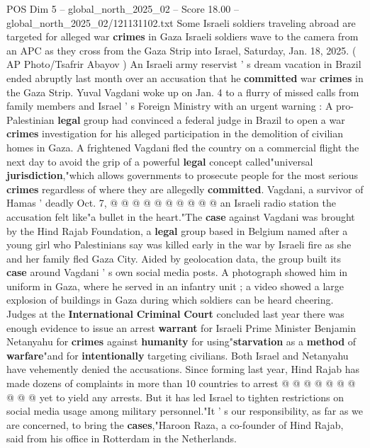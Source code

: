 \begin{textsample}{POS Dim 5 – global\_north\_2025\_02 – Score 18.00 – global\_north\_2025\_02/121131102.txt}  \label{ex:f5_pos_205}
Some Israeli soldiers traveling abroad are targeted for alleged war \textbf{crimes} in Gaza Israeli soldiers wave to the camera from an APC as they cross from the Gaza Strip into Israel, Saturday, Jan. 18, 2025. ( AP Photo/Tsafrir Abayov ) An Israeli army reservist ' s dream vacation in Brazil ended abruptly last month over an accusation that he \textbf{committed} war \textbf{crimes} in the Gaza Strip.
Yuval Vagdani woke up on Jan. 4 to a flurry of missed calls from family members and Israel ' s Foreign Ministry with an urgent warning : A pro-Palestinian \textbf{legal} group had convinced a federal judge in Brazil to open a war \textbf{crimes} investigation for his alleged participation in the demolition of civilian homes in Gaza.
A frightened Vagdani fled the country on a commercial flight the next day to avoid the grip of a powerful \textbf{legal} concept called"universal \textbf{jurisdiction},"which allows governments to prosecute people for the most serious \textbf{crimes} regardless of where they are allegedly \textbf{committed}.
Vagdani, a survivor of Hamas ' deadly Oct. 7, @ @ @ @ @ @ @ @ @ @ an Israeli radio station the accusation felt like"a bullet in the heart."The \textbf{case} against Vagdani was brought by the Hind Rajab Foundation, a \textbf{legal} group based in Belgium named after a young girl who Palestinians say was killed early in the war by Israeli fire as she and her family fled Gaza City.
Aided by geolocation data, the group built its \textbf{case} around Vagdani ' s own social media posts.
A photograph showed him in uniform in Gaza, where he served in an infantry unit ; a video showed a large explosion of buildings in Gaza during which soldiers can be heard cheering.
Judges at the \textbf{International} \textbf{Criminal} \textbf{Court} concluded last year there was enough evidence to issue an arrest \textbf{warrant} for Israeli Prime Minister Benjamin Netanyahu for \textbf{crimes} against \textbf{humanity} for using"\textbf{starvation} as a \textbf{method} of \textbf{warfare}"and for \textbf{intentionally} targeting civilians.
Both Israel and Netanyahu have vehemently denied the accusations.
Since forming last year, Hind Rajab has made dozens of complaints in more than 10 countries to arrest @ @ @ @ @ @ @ @ @ @ yet to yield any arrests.
But it has led Israel to tighten restrictions on social media usage among military personnel."It ' s our responsibility, as far as we are concerned, to bring the \textbf{cases},"Haroon Raza, a co-founder of Hind Rajab, said from his office in Rotterdam in the Netherlands.

\end{textsample}
